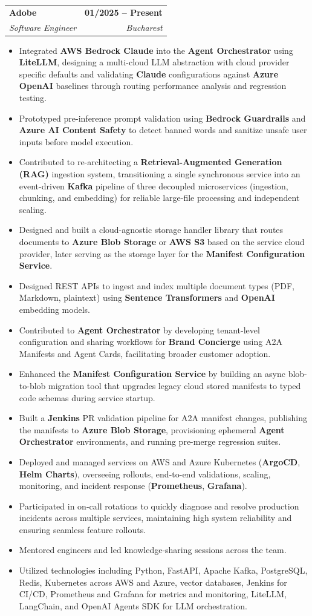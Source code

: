 \documentclass[letterpaper,11pt]{article}
\makeatletter
\newcommand{\resumeItem}[1]{
  \item\small{
    {#1 \vspace{-2pt}}
  }
}
\newcommand{\resumeSubheading}[4]{
  \vspace{-2pt}\item
    \begin{tabular*}{1.0\textwidth}[t]{l@{\extracolsep{\fill}}r}
      \textbf{#1} & \textbf{\small #2} \\
      \textit{\small#3} & \textit{\small #4} \\
    \end{tabular*}\vspace{-7pt}
}
\newcommand{\resumeItemListStart}{\begin{itemize}}
\newcommand{\resumeItemListEnd}{\end{itemize}\vspace{-5pt}}
\makeatother
\begin{document}
    \resumeSubheading
      {Adobe}{01/2025 -- Present}
      {Software Engineer}{Bucharest}
        \resumeItemListStart
            \resumeItem{Integrated \textbf{AWS Bedrock Claude} into the \textbf{Agent Orchestrator} using \textbf{LiteLLM}, designing a multi-cloud LLM abstraction with cloud provider specific defaults and validating \textbf{Claude} configurations against \textbf{Azure OpenAI} baselines through routing performance analysis and regression testing.}
            \resumeItem{Prototyped pre-inference prompt validation using \textbf{Bedrock Guardrails} and \textbf{Azure AI Content Safety} to detect banned words and sanitize unsafe user inputs before model execution.}
            \resumeItem{Contributed to re-architecting a \textbf{Retrieval-Augmented Generation (RAG)} ingestion system, transitioning a single synchronous service into an event-driven \textbf{Kafka} pipeline of three decoupled microservices (ingestion, chunking, and embedding) for reliable large-file processing and independent scaling.}
            \resumeItem{Designed and built a cloud-agnostic storage handler library that routes documents to \textbf{Azure Blob Storage} or \textbf{AWS S3} based on the service cloud provider, later serving as the storage layer for the \textbf{Manifest Configuration Service}.}
            \resumeItem{Designed REST APIs to ingest and index multiple document types (PDF, Markdown, plaintext) using \textbf{Sentence Transformers} and \textbf{OpenAI} embedding models.}
            \resumeItem{Contributed to \textbf{Agent Orchestrator} by developing tenant-level configuration and sharing workflows for \textbf{Brand Concierge} using A2A Manifests and Agent Cards, facilitating broader customer adoption.}
            \resumeItem{Enhanced the \textbf{Manifest Configuration Service} by building an async blob-to-blob migration tool that upgrades legacy cloud stored manifests to typed code schemas during service startup.}
            \resumeItem{Built a \textbf{Jenkins} PR validation pipeline for A2A manifest changes, publishing the manifests to \textbf{Azure Blob Storage}, provisioning ephemeral \textbf{Agent Orchestrator} environments, and running pre-merge regression suites.}
            \resumeItem{Deployed and managed services on AWS and Azure Kubernetes (\textbf{ArgoCD}, \textbf{Helm Charts}), overseeing rollouts, end-to-end validations, scaling, monitoring, and incident response (\textbf{Prometheus}, \textbf{Grafana}).}
            \resumeItem{Participated in on-call rotations to quickly diagnose and resolve production incidents across multiple services, maintaining high system reliability and ensuring seamless feature rollouts.}
            \resumeItem{Mentored engineers and led knowledge-sharing sessions across the team.}
            \resumeItem{Utilized technologies including Python, FastAPI, Apache Kafka, PostgreSQL, Redis, Kubernetes across AWS and Azure, vector databases, Jenkins for CI/CD, Prometheus and Grafana for metrics and monitoring, LiteLLM, LangChain, and OpenAI Agents SDK for LLM orchestration.}
        \resumeItemListEnd
\end{document}
